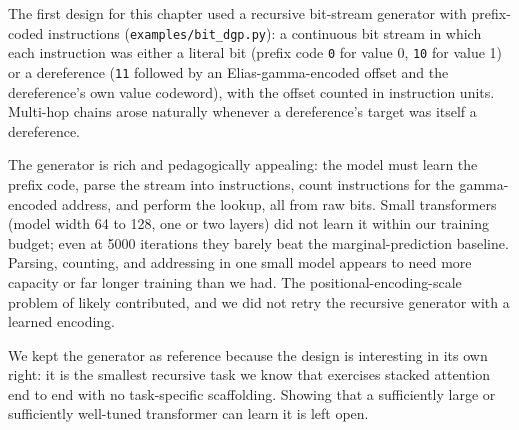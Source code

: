 The first design for this chapter used a recursive bit-stream generator
with prefix-coded instructions (\texttt{examples/bit\_dgp.py}): a
continuous bit stream in which each instruction was either a literal bit
(prefix code \texttt{0} for value 0, \texttt{10} for value 1) or a
dereference (\texttt{11} followed by an Elias-gamma-encoded offset and the
dereference's own value codeword), with the offset counted in instruction
units. Multi-hop chains arose naturally whenever a dereference's target
was itself a dereference.

The generator is rich and pedagogically appealing: the model must learn
the prefix code, parse the stream into instructions, count instructions
for the gamma-encoded address, and perform the lookup, all from raw bits.
Small transformers (model width 64 to 128, one or two layers) did not
learn it within our training budget; even at 5000 iterations they barely
beat the marginal-prediction baseline. Parsing, counting, and addressing
in one small model appears to need more capacity or far longer training
than we had. The positional-encoding-scale problem of
 likely contributed, and we did not retry the
recursive generator with a learned encoding.

We kept the generator as reference because the design is interesting in
its own right: it is the smallest recursive task we know that exercises
stacked attention end to end with no task-specific scaffolding. Showing
that a sufficiently large or sufficiently well-tuned transformer can
learn it is left open.
